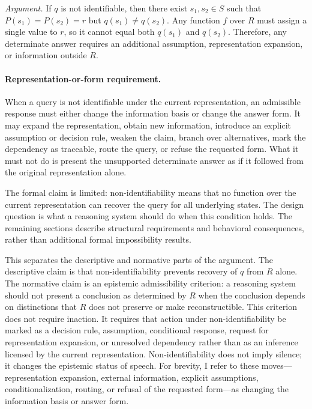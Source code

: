 \documentclass[11pt]{article}
\begin{document}
\emph{Argument.}
If $q$ is not identifiable, then there exist $s_1,s_2\in S$ such that $P(s_1)=P(s_2)=r$ but $q(s_1)\neq q(s_2)$. Any function $f$ over $R$ must assign a single value to $r$, so it cannot equal both $q(s_1)$ and $q(s_2)$. Therefore, any determinate answer requires an additional assumption, representation expansion, or information outside $R$.

\paragraph{Representation-or-form requirement.}
When a query is not identifiable under the current representation, an admissible response must either change the information basis or change the answer form. It may expand the representation, obtain new information, introduce an explicit assumption or decision rule, weaken the claim, branch over alternatives, mark the dependency as traceable, route the query, or refuse the requested form. What it must not do is present the unsupported determinate answer as if it followed from the original representation alone.

The formal claim is limited: non-identifiability means that no function over the current representation can recover the query for all underlying states. The design question is what a reasoning system should do when this condition holds. The remaining sections describe structural requirements and behavioral consequences, rather than additional formal impossibility results.

This separates the descriptive and normative parts of the argument. The descriptive claim is that non-identifiability prevents recovery of $q$ from $R$ alone. The normative claim is an epistemic admissibility criterion: a reasoning system should not present a conclusion as determined by $R$ when the conclusion depends on distinctions that $R$ does not preserve or make reconstructible. This criterion does not require inaction. It requires that action under non-identifiability be marked as a decision rule, assumption, conditional response, request for representation expansion, or unresolved dependency rather than as an inference licensed by the current representation. Non-identifiability does not imply silence; it changes the epistemic status of speech. For brevity, I refer to these moves---representation expansion, external information, explicit assumptions, conditionalization, routing, or refusal of the requested form---as changing the information basis or answer form.
\end{document}
